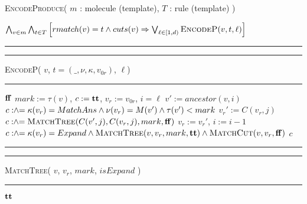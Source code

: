 \begin{algorithm}[t]
  \caption{\textsc{EncodeProduce}( $m$ : molecule (template), $T$ : rule (template) )}
  \label{alg:produce}
  \begin{algorithmic}[1]
    \State \Return $
    \bigwedge_{v\in m}
    \bigwedge_{t \in T}
    \left[
      rmatch(v) = t \land cuts(v) \Rightarrow \bigvee_{ {\ell \in [1,d)}} \textsc{EncodeP}( v, t, \ell)
      \right]
      $
  \end{algorithmic}
  \hrule
  \vspace{1ex}
  \hrule\vspace{2pt}
  \textsc{EncodeP}( $v$, $t = (\_,\nu,\kappa,v_{0r})$, $\ell$)\hfill\mbox{}
  \vspace{2pt}\hrule
  \begin{algorithmic}[1]
     \quad \Return $\mathbf{ff}$
    \EndIf
    \State $mark := \tau(v)$,\; $c := \mathbf{tt}$, \; $v_r := v_{0r}$, \; $i = \ell$
    \label{line:encodep-while}
    \State $v' := ancestor(v,i)$
    \State $c \mathrel{:\hspace{-3pt}\land\hspace{-3pt}=}  \kappa(v_r) = MatchAns \land \nu(v_r) = M(v') \land \tau(v') < mark$
    \label{line:encodep-ans-match}
    \label{line:encodep-sub-for-loop}
       \label{line:encodep-jth-child-cond}
       \State $v_r' := C(v_r, j)$ 
       \label{line:encodep-next-vr}
    \Else
       \State $c \mathrel{:\hspace{-3pt}\land\hspace{-3pt}=} \textsc{MatchTree}(C(v',j), C(v_r, j),mark, \mathbf{ff})$
       \label{line:mtree}
    \EndIf
    \EndFor
    \State $v_r := v_r'$,\; $i := i - 1$
    \label{line:encodep-update-vr}
    \EndWhile
    \label{line:encodep-end-whileloop}
    \State $c \mathrel{:\hspace{-3pt}\land\hspace{-3pt}=}  \kappa(v_r) = Expand \land \textsc{MatchTree}(v, v_r,mark,\mathbf{tt}) \land \textsc{MatchCut}(v, v_r,\mathbf{ff})$
    \label{line:encodep-vr-expand}
    \State \Return $c$
  \end{algorithmic}
  \hrule
  \vspace{1ex}
  \hrule\vspace{2pt}
  \textsc{MatchTree}( $v$, $v_r$, $mark$, $isExpand$ )\hfill\mbox{}
  \vspace{2pt}\hrule
  \begin{algorithmic}[1]
     \Return $\mathbf{tt}$ \EndIf
    \label{line:matchtree-vr-absent}

\end{algorithmic}
\end{algorithm}
